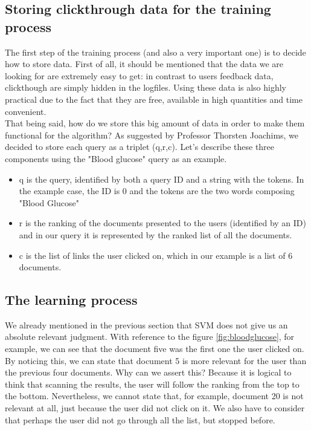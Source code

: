 \documentclass{article}
\begin{document}
\subsection{Storing clickthrough data for the training process}
The first step of the training process (and also a very important one) is to decide how to store data. First of all, it should be mentioned that the data we are looking for are extremely easy to get: in contrast to users feedback data, clickthough are simply hidden in the logfiles. Using these data is also highly practical due to the fact that they are free, available in high quantities and time convenient.\\
That being said, how do we store this big amount of data in order to make them functional for the algorithm?
As suggested by Professor Thorsten Joachims, we decided to store each query as a triplet (q,r,c). Let's describe these three components using the "Blood glucose" query as an example.
\begin{itemize}
\item q is the query, identified by both a query ID and a string with the tokens. In the example case, the ID is 0 and the tokens are the two words composing "Blood Glucose"
\item r is the ranking of the documents presented to the users (identified by an ID) and in our query it is represented by the ranked list of all the documents.
\item c is the list of links the user clicked on, which in our example is a list of 6 documents.
\end{itemize}

\subsection{The learning process}

We already mentioned in the previous section that SVM does not give us an absolute relevant judgment. With reference to the figure \ref{fig:bloodglucose}, for example, we can see that the document five was the first one the user clicked on. By noticing this, we can state that document 5 is more relevant for the user than the previous four documents. Why can we assert this? Because it is logical to think that scanning the results, the user will follow the ranking from the top to the bottom.
Nevertheless, we cannot state that, for example, document 20 is not relevant at all, just because the user did not click on it. We also have to consider that perhaps the user did not go through all the list, but stopped before.\\
\end{document}
